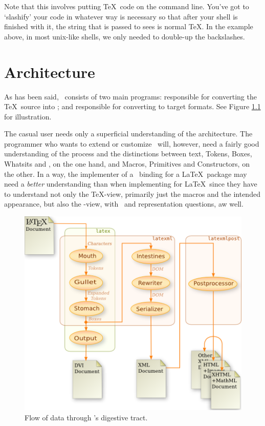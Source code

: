 \documentclass{book}
\begin{document}
Note that this involves putting \TeX\ code on the command line.
You've got to `slashify' your code in whatever way is necessary
so that after your shell is finished with it, the string that
is passed to  sees is normal \TeX.  In the
example above, in most unix-like shells, we only needed to
double-up the backslashes.

\chapter{Architecture}\label{architecture}
As has been said, \LaTeXML\ consists of two main programs:
 responsible for converting the \TeX\ source into \XML;
and  responsible for converting to target formats.
See Figure \ref{fig:dataflow} for illustration.

The casual user needs only a superficial understanding of the architecture.
The programmer who wants to extend or customize \LaTeXML\ will, however,
need a fairly good understanding of the process and the distinctions between
text, Tokens, Boxes, Whatsits and \XML, on the one hand,
and Macros, Primitives and Constructors, on the other.
In a way, the implementer of a \LaTeXML\ binding for a \LaTeX\ package may
need a \emph{better} understanding than when implementing for \LaTeX\
since they have to understand not only the \TeX-view, primarily just the macros
and the intended appearance, but also the \LaTeXML-view, with \XML\
and representation questions, aw well.

\begin{figure}[tb]
\begin{center}
\includegraphics[width=\textwidth]{figures/digestion}
\end{center}
\caption{Flow of data through \LaTeXML's digestive tract.\label{fig:dataflow}}
\end{figure}
\end{document}
